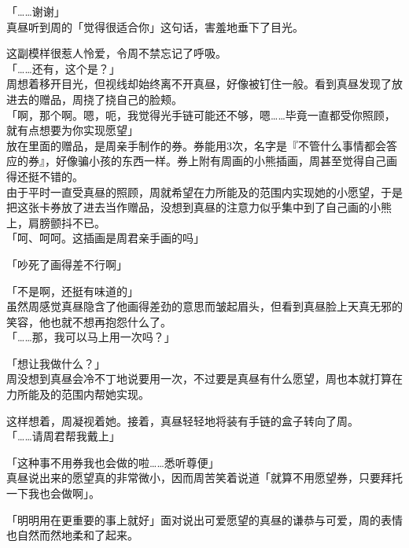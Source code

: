 「……谢谢」\\

真昼听到周的「觉得很适合你」这句话，害羞地垂下了目光。

这副模样很惹人怜爱，令周不禁忘记了呼吸。\\

「……还有，这个是？」\\

周想着移开目光，但视线却始终离不开真昼，好像被钉住一般。看到真昼发现了放进去的赠品，周挠了挠自己的脸颊。\\

「啊，那个啊。嗯，呃，我觉得光手链可能还不够，嗯……毕竟一直都受你照顾，就有点想要为你实现愿望」\\

放在里面的赠品，是周亲手制作的券。券能用3次，名字是『不管什么事情都会答应的券』，好像骗小孩的东西一样。券上附有周画的小熊插画，周甚至觉得自己画得还挺不错的。\\

由于平时一直受真昼的照顾，周就希望在力所能及的范围内实现她的小愿望，于是把这张卡券放了进去当作赠品，没想到真昼的注意力似乎集中到了自己画的小熊上，肩膀颤抖不已。
\\

「呵、呵呵。这插画是周君亲手画的吗」

「吵死了画得差不行啊」

「不是啊，还挺有味道的」\\

虽然周感觉真昼隐含了他画得差劲的意思而皱起眉头，但看到真昼脸上天真无邪的笑容，他也就不想再抱怨什么了。\\

「……那，我可以马上用一次吗？」

「想让我做什么？」\\

周没想到真昼会冷不丁地说要用一次，不过要是真昼有什么愿望，周也本就打算在力所能及的范围内帮她实现。

这样想着，周凝视着她。接着，真昼轻轻地将装有手链的盒子转向了周。\\

「……请周君帮我戴上」

「这种事不用券我也会做的啦……悉听尊便」\\

真昼说出来的愿望真的非常微小，因而周苦笑着说道「就算不用愿望券，只要拜托一下我也会做啊」。

「明明用在更重要的事上就好」面对说出可爱愿望的真昼的谦恭与可爱，周的表情也自然而然地柔和了起来。\\

